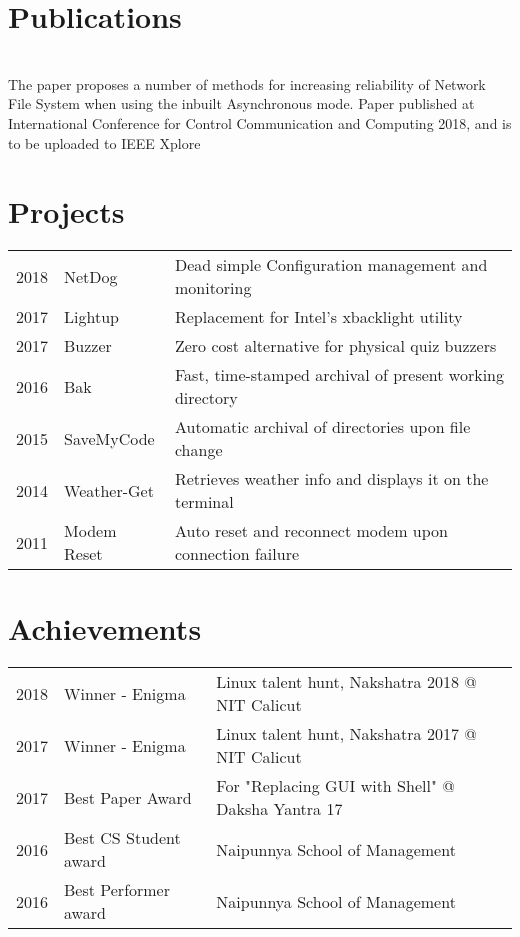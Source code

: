 \documentclass[]{resume_karuvally_openfont}
\begin{document}
\begin{minipage}[t]{0.66\textwidth}

\section{Publications}
 \\
The paper proposes a number of methods for increasing reliability of Network
File System when using the inbuilt Asynchronous mode. Paper published at
International Conference for Control Communication and Computing 2018, and is
to be uploaded to IEEE Xplore
\sectionsep


\section{Projects} 
\begin{tabular}{rll}
2018    & NetDog    & Dead simple Configuration management and monitoring\\
2017    & Lightup   & Replacement for Intel's xbacklight utility\\
2017    & Buzzer    & Zero cost alternative for physical quiz buzzers\\
2016    & Bak       & Fast, time-stamped archival of present working directory\\
2015    & SaveMyCode& Automatic archival of directories upon file change\\
2014    & Weather-Get& Retrieves weather info and displays it on the terminal\\
2011    & Modem Reset& Auto reset and reconnect modem upon connection failure\\
\end{tabular}
\sectionsep


\section{Achievements} 
\begin{tabular}{rll}
2018    & Winner - Enigma   & Linux talent hunt, Nakshatra 2018 @ NIT Calicut\\
2017    & Winner - Enigma   & Linux talent hunt, Nakshatra 2017 @ NIT Calicut\\
2017    & Best Paper Award  & For "Replacing GUI with Shell" @ Daksha Yantra 17\\
2016    & Best CS Student award& Naipunnya School of Management\\
2016    & Best Performer award& Naipunnya School of Management\\
\end{tabular}
\sectionsep

\end{minipage} 
\end{document}
